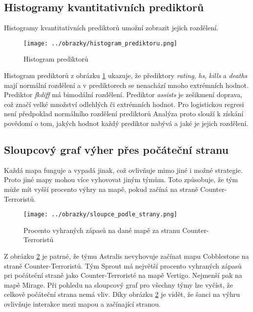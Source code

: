 \newpage
\subsection{Histogramy kvantitativních prediktorů}
Histogramy kvantitativních prediktorů umožní zobrazit jejich rozdělení.

\begin{figure}[H]
    \centering
    \texttt{[image: ../obrazky/histogram\_prediktoru.png]}
    \caption{Histogram prediktorů} 
    \label{fig:histogram_prediktoru}
\end{figure}

Histogram prediktorů z obrázku \ref{fig:histogram_prediktoru} ukazuje, že přediktory \textit{rating}, \textit{hs}, \textit{kills} a \textit{deaths} mají normální rozdělení
a v prediktorech se nenachází mnoho extrémních hodnot.
Prediktor \textit{fkdiff} má bimodální rozdělení. Prediktor \textit{assists} je 
zešikmení doprava, což značí velké množství odlehlých či extrémních hodnot. 
Pro logistickou regresi není předpoklad normálního rozdělení prediktorů Analýza proto slouží k získání povědomí o tom, 
jakých hodnot každý prediktor nabývá a jaké je jejich rozdělení.

\newpage
\subsection{Sloupcový graf výher přes počáteční stranu}
Každá mapa funguje a vypadá jinak, což ovlivňuje mimo jiné i možné strategie. Proto jiné mapy mohou více vyhovovat jiným týmům. Toto způsobuje, že
tým může mít vyšší procento výhry na mapě, pokud začíná na straně Counter-Terroristů.

\begin{figure}[H]
    \centering
    \texttt{[image: ../obrazky/sloupce\_podle\_strany.png]}
    \caption{Procento vyhraných zápasů na dané mapě za stranu Counter-Terroristů} 
    \label{fig:sloupcovy_graf_strany}
\end{figure}

Z obrázku \ref{fig:sloupcovy_graf_strany} je patrné, že týmu Astralis nevyhovuje začínat mapu Cobblestone na straně Counter-Terroristů. Tým Sprout má největší procento
vyhraných zápasů pri počáteční straně jako Counter-Terroristé na mapě Vertigo. Nejmenší pak na mapě Mirage. Při pohledu na sloupcový graf pro všechny týmy lze vyčíst,
že celkově počáteční strana nemá vliv. Díky obrázku \ref{fig:sloupcovy_graf_strany} je vidět, že šanci na výhru ovlivňuje interakce mezi mapou a začínající stranou. 

